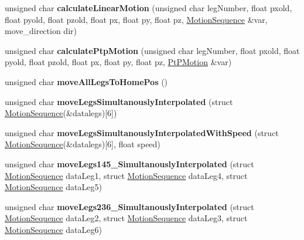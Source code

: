 \begin{DoxyCompactItemize}
\mbox{\label{class_movement_controller_a4993977dbba4add2583a7e9620374b7e}} 
unsigned char {\bfseries calculate\+Linear\+Motion} (unsigned char leg\+Number, float pxold, float pyold, float pzold, float px, float py, float pz, \mbox{\hyperlink{class_motion_sequence}{Motion\+Sequence}} \&var, move\+\_\+direction dir)
\item 
\mbox{\label{class_movement_controller_ae301557fb79d1af8ed3684d3f2b95538}} 
unsigned char {\bfseries calculate\+Ptp\+Motion} (unsigned char leg\+Number, float pxold, float pyold, float pzold, float px, float py, float pz, \mbox{\hyperlink{class_pt_p_motion}{Pt\+P\+Motion}} \&var)
\item 
\mbox{\label{class_movement_controller_a7aaae1e7c080967af1621eff35fb7499}} 
unsigned char {\bfseries move\+All\+Legs\+To\+Home\+Pos} ()
\item 
\mbox{\label{class_movement_controller_aa95482edf0b3ec0a19b9394b768bf800}} 
unsigned char {\bfseries move\+Legs\+Simultanously\+Interpolated} (struct \mbox{\hyperlink{class_motion_sequence}{Motion\+Sequence}}(\&datalegs)\mbox{[}6\mbox{]})
\item 
\mbox{\label{class_movement_controller_ac8c9f20a4fb6effc66d0cce8b9bb3581}} 
unsigned char {\bfseries move\+Legs\+Simultanously\+Interpolated\+With\+Speed} (struct \mbox{\hyperlink{class_motion_sequence}{Motion\+Sequence}}(\&datalegs)\mbox{[}6\mbox{]}, float speed)
\item 
\mbox{\label{class_movement_controller_a279bbc13d80f3e94917b84e13f177b83}} 
unsigned char {\bfseries move\+Legs145\+\_\+\+Simultanously\+Interpolated} (struct \mbox{\hyperlink{class_motion_sequence}{Motion\+Sequence}} data\+Leg1, struct \mbox{\hyperlink{class_motion_sequence}{Motion\+Sequence}} data\+Leg4, struct \mbox{\hyperlink{class_motion_sequence}{Motion\+Sequence}} data\+Leg5)
\item 
\mbox{\label{class_movement_controller_ad25aa3d640fce33f1fb5903e72572cbb}} 
unsigned char {\bfseries move\+Legs236\+\_\+\+Simultanously\+Interpolated} (struct \mbox{\hyperlink{class_motion_sequence}{Motion\+Sequence}} data\+Leg2, struct \mbox{\hyperlink{class_motion_sequence}{Motion\+Sequence}} data\+Leg3, struct \mbox{\hyperlink{class_motion_sequence}{Motion\+Sequence}} data\+Leg6)

\end{DoxyCompactItemize}
